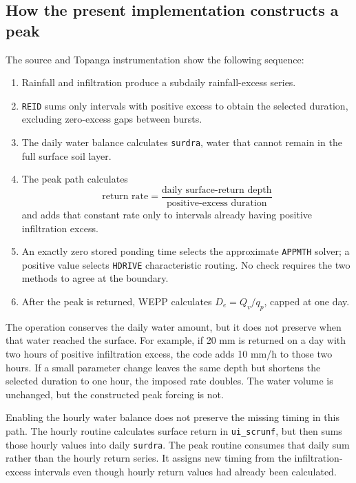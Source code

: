 \documentclass[11pt]{article}
\newcommand{\surdra}{\texttt{surdra}}
\begin{document}
\subsection{How the present implementation constructs a peak}

The source and Topanga instrumentation show the following sequence:

\begin{enumerate}
  \item Rainfall and infiltration produce a subdaily rainfall-excess series.
  \item \texttt{REID} sums only intervals with positive excess to obtain the
    selected duration, excluding zero-excess gaps between bursts.
  \item The daily water balance calculates \surdra{}, water that cannot remain
    in the full surface soil layer.
  \item The peak path calculates
    \begin{equation}
      \text{return rate}=\frac{\text{daily surface-return depth}}
      {\text{positive-excess duration}}
    \end{equation}
    and adds that constant rate only to intervals already having positive
    infiltration excess.
  \item An exactly zero stored ponding time selects the approximate
    \texttt{APPMTH} solver; a positive value selects \texttt{HDRIVE}
    characteristic routing. No check requires the two methods to agree at the
    boundary.
  \item After the peak is returned, WEPP calculates $D_e=Q_v/q_p$, capped at
    one day.
\end{enumerate}

The operation conserves the daily water amount, but it does not preserve when
that water reached the surface. For example, if 20 mm is returned on a day
with two hours of positive infiltration excess, the code adds 10 mm/h to those
two hours. If a small parameter change leaves the same depth but shortens the
selected duration to one hour, the imposed rate doubles. The water volume is
unchanged, but the constructed peak forcing is not.

Enabling the hourly water balance does not preserve the missing timing in this
path. The hourly routine calculates surface return in \texttt{ui\_scrunf}, but
then sums those hourly values into daily \surdra{}. The peak routine consumes
that daily sum rather than the hourly return series. It assigns new timing from
the infiltration-excess intervals even though hourly return values had already
been calculated.
\end{document}
